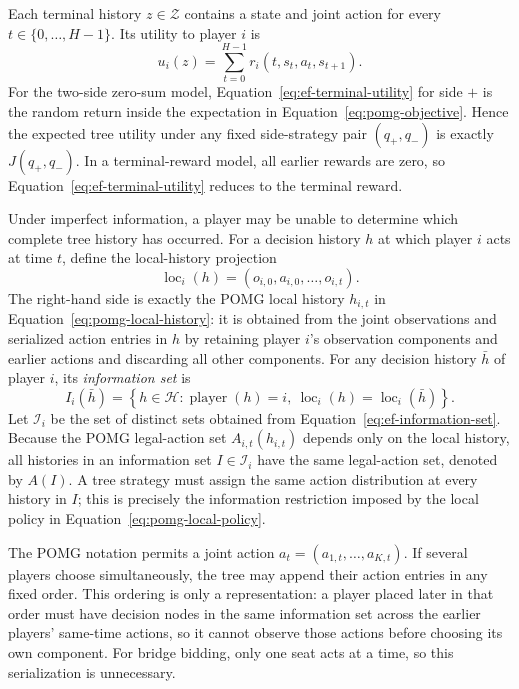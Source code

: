 Each terminal history $z\in\mathcal{Z}$ contains a state and joint action for every $t\in\{0,\ldots,H-1\}$. Its utility to player $i$ is
\begin{equation}
\label{eq:ef-terminal-utility}
    u_i(z)
    =
    \sum_{t=0}^{H-1}r_i(t,s_t,a_t,s_{t+1}).
\end{equation}
For the two-side zero-sum model, Equation~\eqref{eq:ef-terminal-utility} for side $+$ is the random return inside the expectation in Equation~\eqref{eq:pomg-objective}. Hence the expected tree utility under any fixed side-strategy pair $(q_+,q_-)$ is exactly $J(q_+,q_-)$. In a terminal-reward model, all earlier rewards are zero, so Equation~\eqref{eq:ef-terminal-utility} reduces to the terminal reward.

Under imperfect information, a player may be unable to determine which complete tree history has occurred. For a decision history $h$ at which player $i$ acts at time $t$, define the local-history projection
\begin{equation}
\label{eq:ef-local-projection}
    \operatorname{loc}_i(h)
    =
    (o_{i,0},a_{i,0},\ldots,o_{i,t}).
\end{equation}
The right-hand side is exactly the POMG local history $h_{i,t}$ in Equation~\eqref{eq:pomg-local-history}: it is obtained from the joint observations and serialized action entries in $h$ by retaining player $i$'s observation components and earlier actions and discarding all other components. For any decision history $\bar h$ of player $i$, its \emph{information set} is
\begin{equation}
\label{eq:ef-information-set}
    I_i(\bar h)
    =
    \left\{
      h\in\mathcal{H}:
      \operatorname{player}(h)=i,
      \ \operatorname{loc}_i(h)=\operatorname{loc}_i(\bar h)
    \right\}.
\end{equation}
Let $\mathcal{I}_i$ be the set of distinct sets obtained from Equation~\eqref{eq:ef-information-set}. Because the POMG legal-action set $A_{i,t}(h_{i,t})$ depends only on the local history, all histories in an information set $I\in\mathcal{I}_i$ have the same legal-action set, denoted by $A(I)$. A tree strategy must assign the same action distribution at every history in $I$; this is precisely the information restriction imposed by the local policy in Equation~\eqref{eq:pomg-local-policy}.

The POMG notation permits a joint action $a_t=(a_{1,t},\ldots,a_{K,t})$. If several players choose simultaneously, the tree may append their action entries in any fixed order. This ordering is only a representation: a player placed later in that order must have decision nodes in the same information set across the earlier players' same-time actions, so it cannot observe those actions before choosing its own component. For bridge bidding, only one seat acts at a time, so this serialization is unnecessary.


